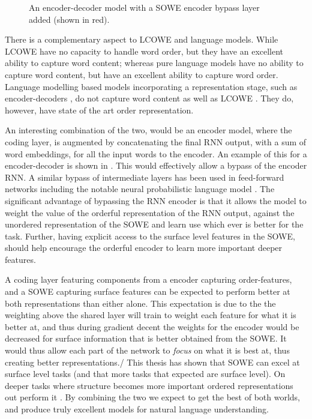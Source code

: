 \documentclass{book}
\begin{document}
\begin{figure}
{
	}
	\caption{An encoder-decoder model with a SOWE encoder bypass layer added (shown in red). \label{fig:enhancedencoderdecoder}}
\end{figure}


There is a complementary aspect to LCOWE and language models.
While LCOWE have no capacity to handle word order, but they have an excellent ability to capture word content;
whereas pure language models have no ability to capture word content, but have an excellent ability to capture word order.
Language modelling based models incorporating a representation stage, such as encoder-decoders \citep{cho-EtAl:2014:EMNLP2014}, do not capture word content as well as LCOWE \citep{ac2018probingsentencevectors}.
They do, however, have state of the art order representation.

An interesting combination of the two,
would be an encoder model,
where the coding layer,
is augmented by concatenating the final RNN output, with a sum of word embeddings, for all the input words to the encoder.
An example of this for a encoder-decoder is shown in .
This would effectively allow a bypass of the encoder RNN.
A similar bypass of intermediate layers has been used in feed-forward networks including the notable neural probabilistic language model \citep{NPLM}.
The significant advantage of bypassing the RNN encoder is that it allows the model to weight the value of the orderful representation of the RNN output, against the unordered representation of the SOWE and learn use which ever is better for the task.
Further, having explicit access to the surface level features in the SOWE,
should help encourage the orderful encoder to learn more important deeper features.

A coding layer featuring components from a encoder capturing order-features, and a SOWE capturing surface features can be expected to perform better at both representations than either alone.
This expectation is due to the the weighting  above  the shared layer will train to weight each feature for what it is better at, and thus during gradient decent the weights for the encoder would be decreased for surface information that is better obtained from the SOWE.
It would thus allow each part of the network to \emph{focus} on what it is best at, thus  creating better representations./
This thesis has shown that SOWE can excel at surface level tasks (and that more tasks that expected are surface level).
On deeper tasks where structure becomes more important ordered representations out perform it \parencite{ac2018probingsentencevectors}.
By combining the two we expect to get the best of both worlds,
and produce truly excellent models for natural language understanding.
\end{document}
